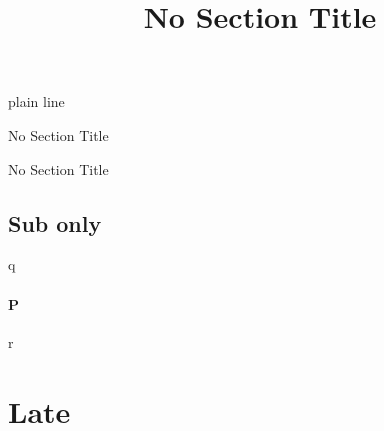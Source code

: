 \documentclass{article}
\title{No Section Title}
\begin{document}
\begin{center}{\large plain line}\end{center}
\begin{center}{\LARGE No Section Title}\end{center}
\begin{center}{\LARGE No Section Title}\end{center}
\subsection{Sub only}
q
\paragraph{P} r
\section{Late}
\end{document}
